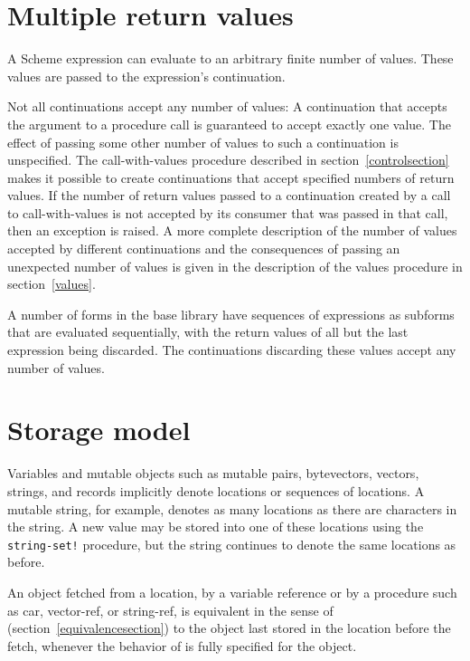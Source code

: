 \section{Multiple return values}
\label{multiplereturnvaluessection}

A Scheme expression can evaluate to an arbitrary finite number of
values.  These values are passed to the expression's continuation.

Not all continuations accept any number of values: A continuation that
accepts the argument to a procedure call is guaranteed to accept
exactly one value.  The effect of passing some other number of values
to such a continuation is unspecified.  The {\cf call-with-values}
procedure
described in section~\ref{controlsection} makes it possible to create
continuations that accept specified numbers of return values.
If the number of
return values passed to a continuation created by a call to
{\cf call-with-values} is not accepted by its consumer
that was passed in that call, then an exception is raised.
A more complete description of the number of values accepted by
different continuations and the consequences of passing an unexpected
number of values is given in the description of the {\cf values}
procedure in section~\ref{values}.

A number of forms in the base library have sequences of expressions
as subforms that are evaluated sequentially, with the return values of
all but the last expression being discarded.  The continuations
discarding these values accept any number of values.

\section{Storage model}
\label{storagemodel}

Variables and mutable objects such as mutable pairs, bytevectors, vectors, strings,
and records implicitly
denote locations or sequences of locations.  A
mutable string, for example, denotes as many locations as there are characters in the string. 
A new value may be
stored into one of these locations using the {\tt string-set!} procedure, but
the string continues to denote the same locations as before.

An object fetched from a location, by a variable reference or by
a procedure such as {\cf car}, {\cf vector-ref}, or {\cf string-ref}, is
equivalent in the sense of  %
(section~\ref{equivalencesection})
to the object last stored in the location before the fetch, whenever
the behavior of  is fully specified for the object.

